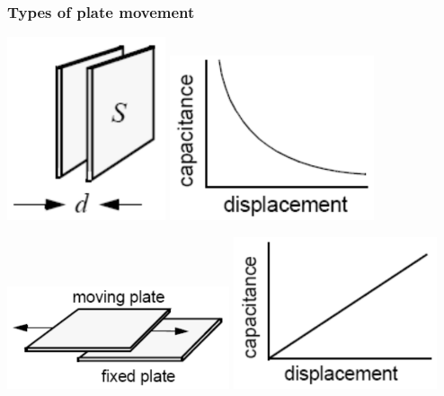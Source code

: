 \documentclass[11pt]{article}
\begin{document}
\subsubsection{Types of plate movement}
\label{sec:org22479e0}
\begin{center}
\includegraphics[width=0.35\textwidth]{./images/plates-moving-closer-together.png}
\includegraphics[width=0.45\textwidth]{./images/plates-moving-closer-together-graph.png}
\end{center}

\begin{center}
\includegraphics[width=0.49\textwidth]{./images/plates-moving-past-each-other.png}
\includegraphics[width=0.45\textwidth]{./images/plates-moving-past-each-other-graph.png}
\end{center}
\end{document}
